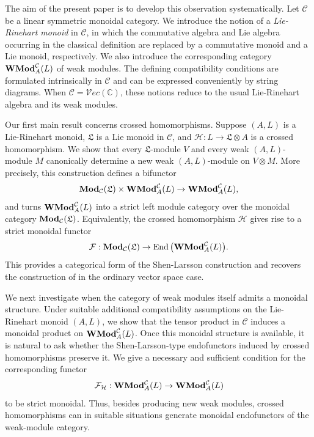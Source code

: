 \documentclass[11pt]{amsart}
\theoremstyle{definition}
\numberwithin{equation}{section}
\begin{document}
The aim of the present paper is to develop this observation systematically. 
Let $\mathcal C$ be a linear symmetric monoidal category. 
We introduce the notion of a \emph{Lie-Rinehart monoid} in $\mathcal C$, in which the commutative algebra and Lie algebra occurring in the classical definition are replaced by a commutative monoid and a Lie monoid, respectively. 
We also introduce the corresponding category ${\bf WMod}^{\mathcal C}_A(L)$ of weak modules. 
The defining compatibility conditions are formulated intrinsically in $\mathcal C$ and can be expressed conveniently by string diagrams. 
When $\mathcal C=\mathcal{V}ec(\mathbb C)$, these notions reduce to the usual Lie-Rinehart algebra and its weak modules.

Our first main result concerns crossed homomorphisms. 
Suppose $(A,L)$ is a Lie-Rinehart monoid, $\mathfrak L$ is a Lie monoid in $\mathcal C$, and $\mathcal H:L\rightarrow \mathfrak L\otimes A$ is a crossed homomorphism. 
We show that every $\mathfrak L$-module $V$ and every weak $(A,L)$-module $M$ canonically determine a new weak $(A,L)$-module on $V\otimes M$. 
More precisely, this construction defines a bifunctor
\[
{\bf Mod}_{\mathcal C}(\mathfrak L)
\times
{\bf WMod}^{\mathcal C}_A(L)
\rightarrow
{\bf WMod}^{\mathcal C}_A(L),
\]
and turns ${\bf WMod}^{\mathcal C}_A(L)$ into a strict left module category over the monoidal category ${\bf Mod}_{\mathcal C}(\mathfrak L)$. 
Equivalently, the crossed homomorphism $\mathcal H$ gives rise to a strict monoidal functor
\[
\mathcal{F}: {\bf Mod}_{\mathcal C}(\mathfrak L)
\rightarrow
\operatorname{End}\big({\bf WMod}^{\mathcal C}_A(L)\big).
\]
This provides a categorical form of the Shen-Larsson construction and recovers the construction of \cite{PSTZ23} in the ordinary vector space case.

We next investigate when the category of weak modules itself admits a monoidal structure. 
Under suitable additional compatibility assumptions on the Lie-Rinehart monoid $(A,L)$, we show that the tensor product in $\mathcal C$ induces a monoidal product on
${\bf WMod}^{\mathcal C}_A(L)$. 
Once this monoidal structure is available, it is natural to ask whether the Shen-Larsson-type endofunctors induced by crossed homomorphisms preserve it. 
We give a necessary and sufficient condition for the corresponding functor
\[
\mathcal F_{\mathcal H}:
{\bf WMod}^{\mathcal C}_A(L)
\rightarrow
{\bf WMod}^{\mathcal C}_A(L)
\]
to be strict monoidal. 
Thus, besides producing new weak modules, crossed homomorphisms can in suitable situations generate monoidal endofunctors of the weak-module category.
\end{document}
